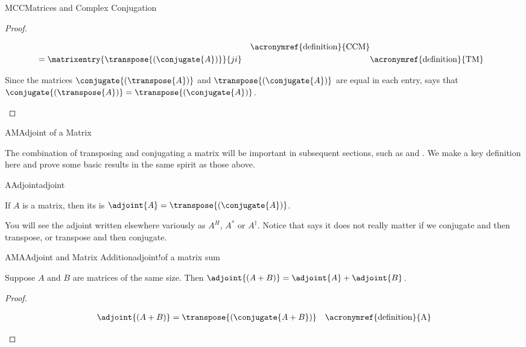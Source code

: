 \begin{subsect}{MCC}{Matrices and Complex Conjugation}
\begin{proof}
\begin{para}
\begin{align*}
&&\text{\acronymref{definition}{CCM}}\\
%
&=\matrixentry{\transpose{\left(\conjugate{A}\right)}}{ji}
&&\text{\acronymref{definition}{TM}}\\
%
\end{align*}
\end{para}
%
\begin{para}Since the matrices  $\conjugate{\left(\transpose{A}\right)}$ and $\transpose{\left(\conjugate{A}\right)}$  are equal in each entry,  says that $\conjugate{\left(\transpose{A}\right)}=\transpose{\left(\conjugate{A}\right)}$.\end{para}
%
\end{proof}
%
\end{subsect}
%
\begin{subsect}{AM}{Adjoint of a Matrix}
%
\begin{para}The combination of transposing and conjugating a matrix will be important in subsequent sections, such as  and .  We make a key definition here and prove some basic results in the same spirit as those above.\end{para}
%
\begin{definition}{A}{Adjoint}{adjoint}
\begin{para}If $A$ is a matrix, then its  is
$\adjoint{A}=\transpose{\left(\conjugate{A}\right)}$.\end{para}
\end{definition}
%
\begin{para}You will see the adjoint written elsewhere variously as $A^H$, $A^\ast$ or $A^\dagger$.  Notice that  says it does not really matter if we conjugate and then transpose, or transpose and then conjugate.\end{para}
%
\begin{theorem}{AMA}{Adjoint and Matrix Addition}{adjoint!of a matrix sum}
\begin{para}Suppose $A$ and $B$ are matrices of the same size.  Then $\adjoint{\left(A+B\right)}=\adjoint{A}+\adjoint{B}$.\end{para}
\end{theorem}
%
\begin{proof}
%
\begin{para}
\begin{align*}
\adjoint{\left(A+B\right)}
&=\transpose{\left(\conjugate{A+B}\right)}
&&\text{\acronymref{definition}{A}}\\

\end{align*}
\end{para}
\end{proof}
\end{subsect}
